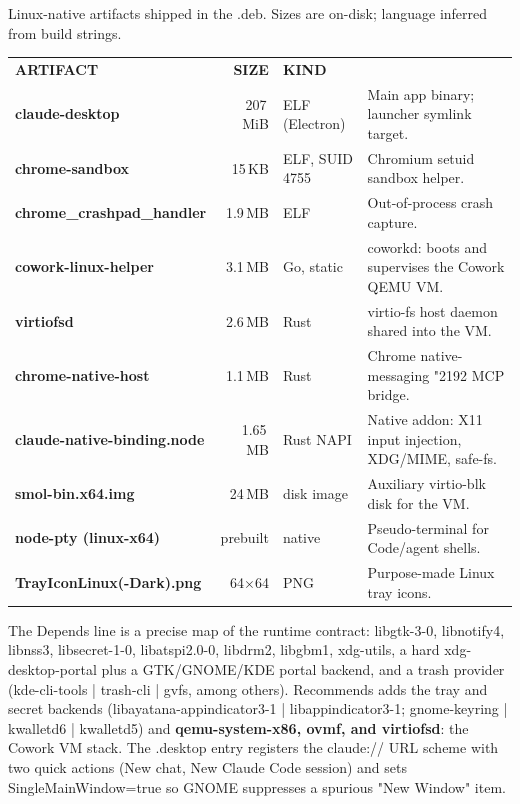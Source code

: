 \documentclass[11pt]{article}
\newcommand{\mono}{\ttfamily}
\newcommand{\arrow}{{\symfont\char"2192}}
\newcommand{\reppar}[1]{{\fontsize{10.5}{15.2}\selectfont #1\par}\vspace{8pt}}
\newcommand{\code}[1]{{\mono\small #1}}
\newcommand{\tabcap}[1]{{\mono\color{faint}\fontsize{8.4}{11}\selectfont #1\par}\vspace{5pt}}
\newcommand{\thd}[1]{{\mono\bfseries\footnotesize\color{white}\MakeUppercase{#1}}}
\newcommand{\thdr}[1]{\multicolumn{1}{r}{\thd{#1}}}
\newcommand{\tname}[1]{\textbf{\color{base700}#1}}
\begin{document}
\begin{table}[H]
\tabcap{Linux-native artifacts shipped in the .deb. Sizes are on-disk; language inferred from build strings.}
\setlength{\tabcolsep}{7pt}\renewcommand{\arraystretch}{1.3}
\noindent\begin{tabular}{@{}l r l >{\raggedright\arraybackslash}p{88mm}@{}}
\rowcolor{base800}
\thd{Artifact} & \thdr{Size} & \thd{Kind} & \multicolumn{1}{l}{\thd{Role on Linux}} \\
\tname{claude-desktop} & 207\,MiB & ELF (Electron) & Main app binary; launcher symlink target. \\
\tname{chrome-sandbox} & 15\,KB & ELF, SUID 4755 & Chromium setuid sandbox helper. \\
\tname{chrome\_crashpad\_handler} & 1.9\,MB & ELF & Out-of-process crash capture. \\
\tname{cowork-linux-helper} & 3.1\,MB & Go, static & \code{coworkd}: boots and supervises the Cowork QEMU VM. \\
\tname{virtiofsd} & 2.6\,MB & Rust & virtio-fs host daemon shared into the VM. \\
\tname{chrome-native-host} & 1.1\,MB & Rust & Chrome native-messaging \arrow{} MCP bridge. \\
\tname{claude-native-binding.node} & 1.65\,MB & Rust NAPI & Native addon: X11 input injection, XDG/MIME, safe-fs. \\
\tname{smol-bin.x64.img} & 24\,MB & disk image & Auxiliary virtio-blk disk for the VM. \\
\tname{node-pty (linux-x64)} & prebuilt & native & Pseudo-terminal for Code/agent shells. \\
\tname{TrayIconLinux(-Dark).png} & 64$\times$64 & PNG & Purpose-made Linux tray icons. \\
\end{tabular}
\end{table}

\reppar{The \code{Depends} line is a precise map of the runtime contract: \code{libgtk-3-0}, \code{libnotify4}, \code{libnss3}, \code{libsecret-1-0}, \code{libatspi2.0-0}, \code{libdrm2}, \code{libgbm1}, \code{xdg-utils}, a hard \code{xdg-desktop-portal} plus a GTK/GNOME/KDE portal backend, and a trash provider (\code{kde-cli-tools} \code{|} \code{trash-cli} \code{|} \code{gvfs}, among others). \code{Recommends} adds the tray and secret backends (\code{libayatana-appindicator3-1} \code{|} \code{libappindicator3-1}; \code{gnome-keyring} \code{|} \code{kwalletd6} \code{|} \code{kwalletd5}) and \textbf{\code{qemu-system-x86}, \code{ovmf}, and \code{virtiofsd}}: the Cowork VM stack. The \code{.desktop} entry registers the \code{claude://} URL scheme with two quick actions (New chat, New Claude Code session) and sets \code{SingleMainWindow=true} so GNOME suppresses a spurious "New Window" item.}
\end{document}
